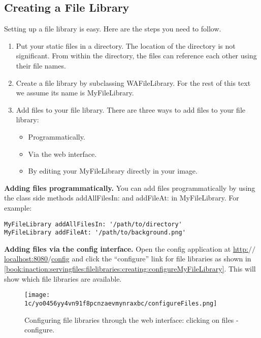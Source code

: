 \documentclass[a4paper,10pt,twoside]{book}
\newcommand{\ct}[1]{{\small\ttfamily\textup{#1}}}
\begin{document}
\subsection{Creating a File Library}
\label{book:inaction:servingfiles:filelibraries:creating}

Setting up a file library is easy. Here are the steps you need to follow.

\begin{enumerate}
\item  Put your static files in a directory. The location of the directory is not significant. From within the directory, the files can reference each other using their file names.
\item  Create a file library by subclassing  \ct{WAFileLibrary}. For the rest of this text we assume its name is  \ct{MyFileLibrary}.
\item  Add files to your file library. There are three ways to add files to your file library:\begin{itemize}
\item  Programmatically. 
\item  Via the web interface.
\item  By editing your \ct{MyFileLibrary} directly in your image.
\end{itemize}

\end{enumerate}

\textbf{Adding files programmatically.} You can add files programmatically by using the class side methods  \ct{addAllFilesIn:} and  \ct{addFileAt:} in \ct{MyFileLibrary}. For example:

\begin{lstlisting}
MyFileLibrary addAllFilesIn: '/path/to/directory'
MyFileLibrary addFileAt: '/path/to/background.png'
\end{lstlisting}

\textbf{Adding files via the config interface.} Open the config application at \href{http://localhost:8080/config}{http:$/$$/$localhost:8080$/$config} and click the ``configure'' link for file libraries as shown in \autoref{book:inaction:servingfiles:filelibraries:creating:configureMyFileLibrary}. This will show which file libraries are available.  

\begin{figure}[h!tbp]
	\begin{center}
		\texttt{[image: 1c/yo0456yy4vn91f8pcnzaevmynraxbc/configureFiles.png]}
		\caption{Configuring file libraries through the web  interface: clicking on files - configure.\label{book:inaction:servingfiles:filelibraries:creating:configureFiles}}
	\end{center}
\end{figure}
\end{document}
